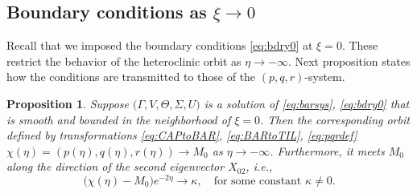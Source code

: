 \documentclass[a4paper,11pt]{article}
\newtheorem{proposition}{Proposition}[section]
\begin{document}
\subsection{Boundary conditions as $\xi \rightarrow 0$}
Recall that we imposed the boundary conditions \eqref{eq:bdry0} at $\xi=0$. These restrict the behavior of the heteroclinic orbit as $\eta \rightarrow -\infty$. Next proposition states how the conditions are transmitted to those of the $(p,q,r)$-system.

\begin{proposition} \label{prop1}
    Suppose $\big(\Gamma,V,\Theta,\Sigma,U\big)$ is a solution of \eqref{eq:barsys}, \eqref{eq:bdry0} that is smooth and bounded in the neighborhood of $\xi=0$. Then the corresponding orbit defined by transformations \eqref{eq:CAPtoBAR}, \eqref{eq:BARtoTIL}, \eqref{eq:pqrdef} $\chi(\eta) = (p(\eta), q(\eta), r(\eta)) \rightarrow M_0$ as $\eta \rightarrow -\infty$. Furthermore, it meets $M_0$ along the direction of the second eigenvector $X_{02}$, i.e.,
    \begin{equation} \label{eq:alpha}
     \big(\chi(\eta) - M_0 \big)e^{-2\eta} \rightarrow \kappa, \quad \text{for some constant $\kappa\ne0$.}
    \end{equation}
\end{proposition}
\end{document}
